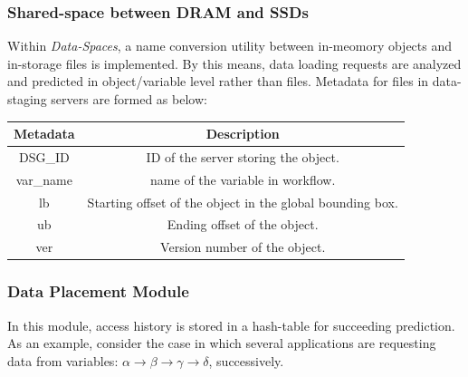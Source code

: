 \documentclass{beamer}
\begin{document}
\begin{frame}
\frametitle{Shared-space between DRAM and SSDs}
Within \textit{Data-Spaces}, a name conversion utility between in-meomory objects and in-storage files is implemented. By this means, data loading requests are analyzed and predicted in object/variable level rather than files. Metadata for files in data-staging servers are formed as below:
            \begin{tabular}{|c|c|}
                    \hline
                    \textbf{Metadata} & \textbf{Description} \\
                    \hline
                    DSG\_ID & ID of the server storing the object.\\
                    \hline
                    var\_name & name of the variable in workflow.\\
                    \hline
                    lb & Starting offset of the object in the global bounding box.\\
                    \hline
                    ub & Ending offset of the object.\\
                    \hline
                    ver & Version number of the object.\\
                    \hline
            \end{tabular}
\end{frame}
\begin{frame}
\frametitle{Data Placement Module}

In this module, access history is stored in a hash-table for succeeding prediction. As an example, consider the case in which several applications are requesting data from variables: \textit{$\alpha \rightarrow \beta \rightarrow \gamma \rightarrow \delta$}, successively. 
\end{frame}
\end{document}
